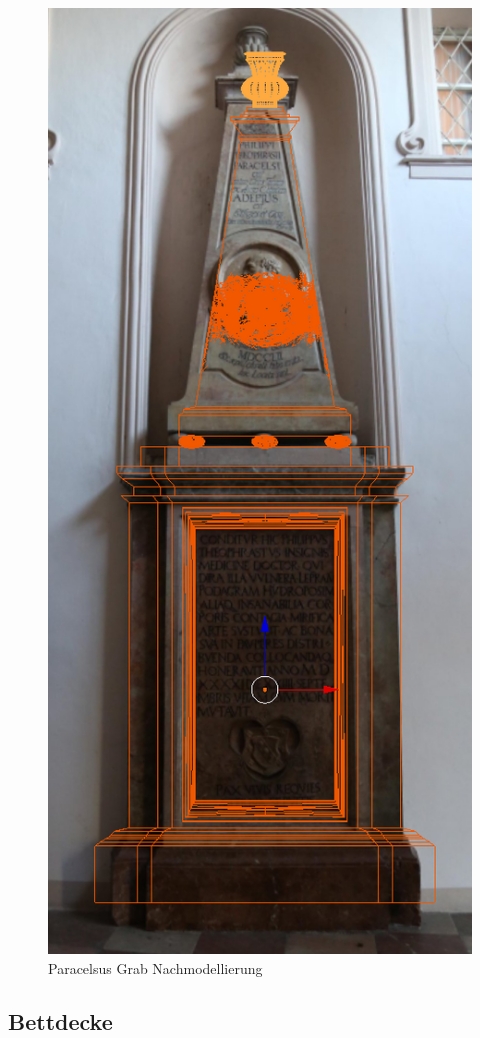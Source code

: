 \begin{figure}[h]
    \centering
    \includegraphics[width=.8\textwidth]{images/Paracelsus-Grab_Nachmodellierung.png}
    \caption{Paracelsus Grab Nachmodellierung}
    \label{Paracelsus_Grab:image2}
\end{figure}
\subsection{Bettdecke}
